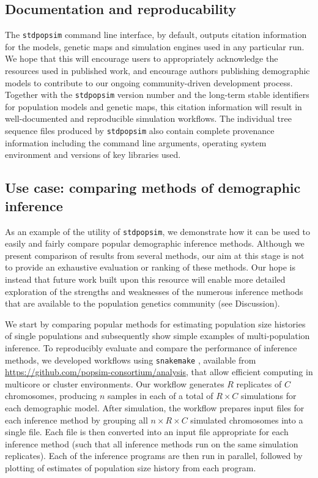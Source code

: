\documentclass[12pt,halfline,a4paper]{ouparticle}
\newcommand{\stdpopsim}{\texttt{stdpopsim}\xspace}
\begin{document}
\subsection*{Documentation and reproducability}

The \stdpopsim command line interface, by default, outputs citation information
for the models, genetic maps and simulation engines used in any particular run.
We hope that this will encourage users to appropriately acknowledge the
resources used in published work, and encourage authors
publishing demographic models to contribute to our ongoing community-driven development process.
Together with the \stdpopsim version number and the long-term stable identifiers
for population models and genetic maps,
this citation information will result in well-documented and reproducible
simulation workflows. The individual tree sequence files produced by
\stdpopsim also contain complete provenance information including the command
line arguments, operating system environment and versions of key libraries
used.

\subsection*{Use case: comparing methods of demographic inference}

As an example of the utility of \stdpopsim, we demonstrate how it can be used
to easily and fairly compare popular demographic inference methods.
Although we present comparison of results from several
methods, our aim at this stage is not to provide an exhaustive
evaluation or ranking of these methods. Our hope is instead that future work built upon this resource
will enable more detailed exploration of the strengths and weaknesses of the numerous
inference methods that are available to the population genetics community
(see Discussion).

We start by comparing popular methods for estimating
population size histories of single populations and subsequently
show simple examples of multi-population inference.
To reproducibly evaluate and compare the performance of inference methods, we developed
workflows using \texttt{snakemake} \citep{koster2012snakemake},
available from \url{https://github.com/popsim-consortium/analysis},
that allow efficient computing in multicore or cluster environments.
Our workflow generates $R$ replicates of $C$ chromosomes,
producing $n$ samples in each of a total of $R \times C$ simulations for each demographic model.
After simulation,
the workflow prepares input files for each inference method
by grouping all $n \times R \times C$ simulated chromosomes
into a single file.
Each file is then converted into an input file appropriate for each inference method
(such that all inference methods run on the same simulation replicates).
Each of the inference programs are then run in parallel, followed by plotting of
estimates of population size history from each program.
\end{document}
